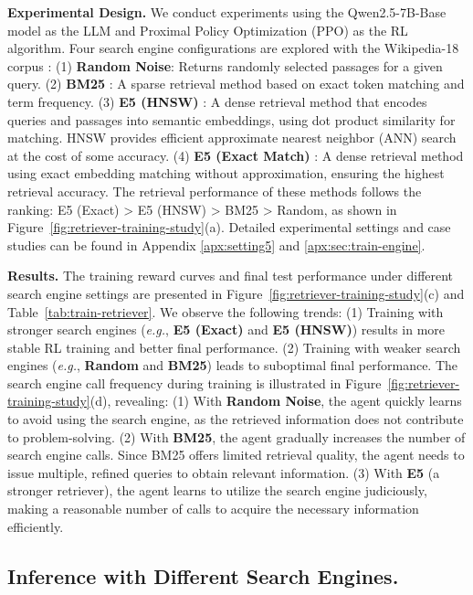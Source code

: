 \textbf{Experimental Design.}
We conduct experiments using the Qwen2.5-7B-Base model as the LLM and Proximal Policy Optimization (PPO) as the RL algorithm. 
Four search engine configurations are explored with the Wikipedia-18 corpus \cite{karpukhin2020dense}:
(1) \textbf{Random Noise}: Returns randomly selected passages for a given query.
(2) \textbf{BM25} \cite{robertson2009probabilistic}: A sparse retrieval method based on exact token matching and term frequency.
(3) \textbf{E5 (HNSW)} \cite{malkov2018efficient,wang2022text}: A dense retrieval method that encodes queries and passages into semantic embeddings, using dot product similarity for matching. HNSW provides efficient approximate nearest neighbor (ANN) search at the cost of some accuracy.
(4) \textbf{E5 (Exact Match)} \cite{wang2022text}: A dense retrieval method using exact embedding matching without approximation, ensuring the highest retrieval accuracy.
The retrieval performance of these methods follows the ranking: E5 (Exact) > E5 (HNSW) > BM25 > Random, as shown in Figure~\ref{fig:retriever-training-study}(a).
Detailed experimental settings and case studies can be found in Appendix \ref{apx:setting5} and \ref{apx:sec:train-engine}.

\textbf{Results.}
The training reward curves and final test performance under different search engine settings are presented in Figure~\ref{fig:retriever-training-study}(c) and Table~\ref{tab:train-retriever}. We observe the following trends:
(1) Training with stronger search engines (\textit{e.g.}, \textbf{E5 (Exact)} and \textbf{E5 (HNSW)}) results in more stable RL training and better final performance.
(2) Training with weaker search engines (\textit{e.g.}, \textbf{Random} and \textbf{BM25}) leads to suboptimal final performance.
The search engine call frequency during training is illustrated in Figure~\ref{fig:retriever-training-study}(d), revealing:
(1) With \textbf{Random Noise}, the agent quickly learns to avoid using the search engine, as the retrieved information does not contribute to problem-solving.
(2) With \textbf{BM25}, the agent gradually increases the number of search engine calls. Since BM25 offers limited retrieval quality, the agent needs to issue multiple, refined queries to obtain relevant information.
(3) With \textbf{E5} (a stronger retriever), the agent learns to utilize the search engine judiciously, making a reasonable number of calls to acquire the necessary information efficiently.

\subsection{Inference with Different Search Engines.}\label{sec:infer-engine}


